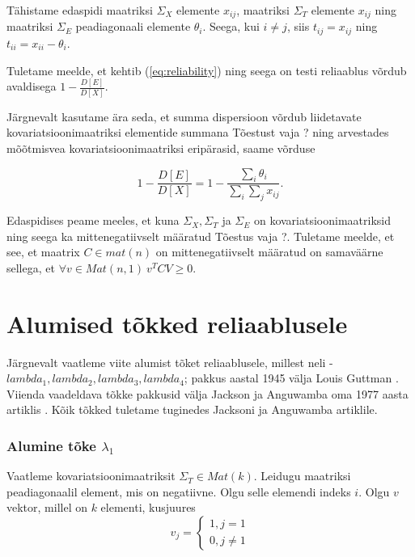 \documentclass[a4paper,12pt]{article}
\numberwithin{equation}{section}
\theoremstyle{definition}
\begin{document}
Tähistame edaspidi maatriksi $\Sigma_X$ elemente  $x_{ij}$, maatriksi $\Sigma_T$ elemente $x_{ij}$ ning maatriksi $\Sigma_E$ peadiagonaali elemente $\theta_i$. Seega, kui $i \neq j$, siis $t_{ij} = x_{ij}$ ning $t_{ii} = x_{ii} - \theta_i$.

Tuletame meelde, et kehtib (\ref{eq:reliability}) ning seega on testi reliaablus võrdub avaldisega $1 - \frac{D \left[ E \right]}{D \left[ X \right]}$. 

Järgnevalt kasutame ära seda, et summa dispersioon võrdub liidetavate kovariatsioonimaatriksi elementide summana {\color{cyan} Tõestust vaja ?} ning arvestades mõõtmisvea kovariatsioonimaatriksi eripärasid, saame võrduse 

\begin{equation}
\label{eq:reliability_cov}
1 - \frac{D \left[ E \right]}{D \left[ X \right]} = 1 - \frac{\sum_i \theta_i }{\sum_i \sum_j x_{ij}}.
\end{equation}

Edaspidises peame meeles, et kuna $\Sigma_X, \Sigma_T$ ja $ \Sigma_E$ on kovariatsioonimaatriksid ning seega ka mittenegatiivselt määratud { \color{cyan} Tõestus vaja ?}. Tuletame meelde, et see, et maatrix $C \in mat(n)$ on mittenegatiivselt määratud on samaväärne sellega, et  $\forall v \in Mat(n,1) ~ v^{T} C V \geq 0$.
\section{Alumised tõkked reliaablusele}

Järgnevalt vaatleme viite alumist tõket reliaablusele, millest neli - $lambda_1,lambda_2,lambda_3,lambda_4$; pakkus aastal 1945 välja Louis Guttman \cite{Guttman1945}. Viienda vaadeldava tõkke pakkusid välja Jackson ja Anguwamba oma 1977 aasta artiklis \cite{Jackson1977}. Kõik tõkked tuletame tuginedes Jacksoni ja Anguwamba artiklile.

\subsubsection{Alumine tõke $\lambda_1$}

Vaatleme kovariatsioonimaatriksit $\Sigma_T \in Mat(k)$. Leidugu maatriksi peadiagonaalil element, mis on negatiivne. Olgu selle elemendi indeks $i$. Olgu $v$ vektor, millel on $k$ elementi, kusjuures 
\begin{equation}
v_j =
\begin{cases}
1, j = 1 \\
0, j \neq 1
\end{cases} 
\end{equation} 
\end{document}
